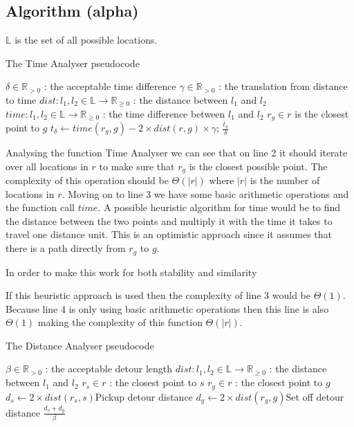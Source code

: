 \subsection{Algorithm (alpha)}

$\mathbb{L}$ is the set of all possible locations.

\begin{algorithm}
	\caption{The Time Analyser pseudocode}
	\begin{algorithmic}[1]
		\Require 
		\Statex $\delta\in \mathbb{R}_{>0}$ : the acceptable time difference
		\Statex $\gamma\in\mathbb{R}_{>0}$ : the translation from distance to time
		\Statex $dist : l_1,l_2 \in \mathbb{L} \rightarrow \mathbb{R}_{\geq 0}$ : the distance between $l_1$ and $l_2$
		\Statex $time : l_1,l_2 \in \mathbb{L} \rightarrow \mathbb{R}_{\geq 0}$ : the time difference between $l_1$ and $l_2$
		\Statex 
			\State $r_g \in r$ is the closest point to $g$
			\State $t_\delta\gets time(r_g, g) - 2\times dist(r,g)\times\gamma$;
			\State\Return $\frac{t_\delta}{\delta}$
		\EndFunction
	\end{algorithmic}
\end{algorithm}

Analysing the function Time Analyser we can see that on line 2 it should iterate over all locations in $r$ to make sure that $r_g$ is the closest possible point.
The complexity of this operation should be $\Theta(|r|)$ where $|r|$ is the number of locations in $r$.
Moving on to line 3 we have some basic arithmetic operations and the function call $time$.
A possible heuristic algorithm for time would be to find the distance between the two points and multiply it with the time it takes to travel one distance unit. 
This is an optimistic approach since it assumes that there is a path directly from $r_g$ to $g$.

In order to make this work for both stability and similarity

If this heuristic approach is used then the complexity of line 3 would be $\Theta(1)$.
Because line 4 is only using basic arithmetic operations then this line is also $\Theta(1)$ making the complexity of this function $\Theta(|r|)$.

 \begin{algorithm}
	\caption{The Distance Analyser pseudocode}
	\begin{algorithmic}[1]
		\Require 
		\Statex $\beta \in \mathbb{R}_{>0}$ : the acceptable detour length
		\Statex $dist : l_1,l_2 \in \mathbb{L} \rightarrow \mathbb{R}_{\geq 0}$ : the distance between $l_1$ and $l_2$
		\Statex 
			\State $r_s \in r$ : the closest point to $s$
			\State $r_g \in r$ : the closest point to $g$
			\State $d_s\gets 2\times dist(r_s, s)$\Comment Pickup detour distance
			\State $d_g\gets 2\times dist(r_g, g)$\Comment Set off detour distance
			\State\Return $\frac{d_s + d_g}{\beta}$
		\EndFunction
	\end{algorithmic}
\end{algorithm}

